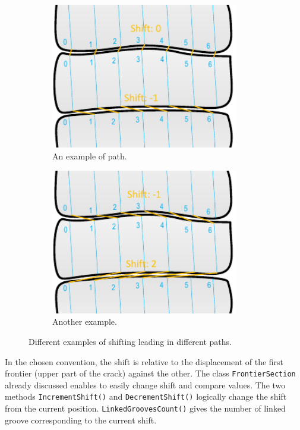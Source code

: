 \begin{figure}[!ht]
\centering
    \begin{subfigure}[t]{0.45\textwidth}
    \centering
    \includegraphics[width=0.9\textwidth]{images/matching-shift-ex-1}
    \caption{An example of path.}
    \label{fig:shiftingex1}
    \end{subfigure}
    \begin{subfigure}[t]{0.45\textwidth}
    \centering
    \includegraphics[width=0.9\textwidth]{images/matching-shift-ex-2}
    \caption{Another example.}
    \label{fig:shiftingex2}
    \end{subfigure}
    \caption{Different examples of shifting leading in different paths.}
    \label{fig:matchshiftingex}
\end{figure}

In the chosen convention, the shift is relative to the displacement of the first frontier (upper part of the crack) against the other. The class \texttt{FrontierSection} already discussed enables to easily change shift and compare values. The two methods \texttt{IncrementShift()} and \texttt{DecrementShift()} logically change the shift from the current position. \texttt{LinkedGroovesCount()} gives the number of linked groove corresponding to the current shift.

